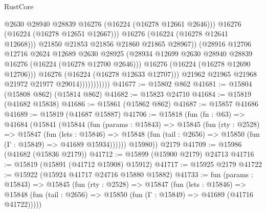 \begin{lexlean}{RustCore}
\begin{coremodule}
                                      @2630
                                      @28940
                                      @28839
                                      @16276
                                      (@16224 (@16278 @12661 @2646)))
                                    @16276
                                    (@16224 (@16278 @12651 @12667)))
                                  @16276
                                  (@16224 (@16278 @12641 @12668)))
                                @21850
                                @21853
                                @21856
                                @21860
                                @21865
                                @28967))
                            (@28916
                              @12706
                              @12716
                              @2624
                              @12689
                              @2630
                              @28925
                              (@28934
                                @12699
                                @2630
                                @28940
                                @28839
                                @16276
                                (@16224 (@16278 @12700 @2646)))
                              @16276
                              (@16224 (@16278 @12690 @12706)))
                            @16276
                            (@16224 (@16278 @12633 @12707)))
                          @21962
                          @21965
                          @21968
                          @21972
                          @21977
                          @29014)))))))))))
@41677 := @15802 @862
@41681 := @15804 (@15808 @862) (@15814 @862)
@41682 := @15823 @24710
@41684 := @15819 (@41682 @15838)
@41686 := @15861 (@15862 @862)
@41687 := @15857 @41686
@41689 := @15819 (@41687 @15887)
@41706 := @15818
    (fun (fn : @63) =>
    @41684
      (@15841
        (@15844
          (fun (params : @15843) =>
          @15845
            (fun (rty : @2528) =>
            @15847
              (fun (lets : @15846) =>
              @15848 (fun (tail : @2656) => @15850 (fun (Γ : @15849) => @41689 @15934))))))
        @15980))
    @2179
@41709 := @15986 (@41682 (@15836 @2179))
@41712 := @15899 (@15900 @2179) @24713
@41716 := @15819 (@15891 (@41712 @15908) @15912)
@41717 := @15925 @2179
@41722 := @15922 (@15924 @41717 @24716 @15880 @15882)
@41733 := fun (params : @15843) =>
  @15845
    (fun (rty : @2528) =>
    @15847
      (fun (lets : @15846) =>
      @15848 (fun (tail : @2656) => @15850 (fun (Γ : @15849) => @41689 (@41716 @41722)))))

\end{coremodule}
\end{lexlean}
